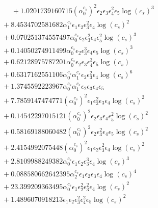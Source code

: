 \documentclass[10pt]{article}
\begin{document}
\begin{align*}
\phantom{F_{s,7}} &\phantom{={}}{}  + 1.0201739160715 \left(\alpha_{0}^{c_s}\right)^{2} \epsilon_{2} \epsilon_{3} \epsilon_{4}^{2} \epsilon_{5} \log{\left(c_{s} \right)}^{3} \\
&{}  + 8.4534702581682 \alpha_{1}^{c_s} \epsilon_{1} \epsilon_{2} \epsilon_{3}^{2} \epsilon_{4} \log{\left(c_{s} \right)}^{2} \\
&{}  + 0.070251374557497 \alpha_{0}^{c_s} \epsilon_{2} \epsilon_{3}^{2} \epsilon_{4} \epsilon_{5}^{2} \log{\left(c_{s} \right)}^{3} \\
&{}  + 0.14050274911499 \alpha_{0}^{c_s} \epsilon_{2} \epsilon_{3}^{3} \epsilon_{4} \epsilon_{5} \log{\left(c_{s} \right)}^{3} \\
&{}  + 0.62128975787201 \alpha_{0}^{c_s} \epsilon_{2} \epsilon_{3} \epsilon_{4}^{3} \epsilon_{5} \log{\left(c_{s} \right)} \\
&{}  + 0.6317162551106 \alpha_{0}^{c_s} \alpha_{1}^{c_s} \epsilon_{2} \epsilon_{3}^{2} \epsilon_{4} \log{\left(c_{s} \right)}^{6} \\
&{}  + 1.3745592223967 \alpha_{0}^{c_s} \alpha_{1}^{c_s} \epsilon_{2} \epsilon_{3} \epsilon_{4} \epsilon_{5} \\
&{}  + 7.7859147474771 \left(\alpha_{0}^{c_s}\right)^{2} \epsilon_{1} \epsilon_{2}^{2} \epsilon_{3} \epsilon_{4} \log{\left(c_{s} \right)}^{2} \\
&{}  + 0.14542297015121 \left(\alpha_{0}^{c_s}\right)^{2} \epsilon_{2} \epsilon_{3} \epsilon_{4} \epsilon_{5}^{2} \log{\left(c_{s} \right)}^{2} \\
&{}  + 0.58169188060482 \left(\alpha_{0}^{c_s}\right)^{2} \epsilon_{2} \epsilon_{3}^{2} \epsilon_{4} \epsilon_{5} \log{\left(c_{s} \right)}^{2} \\
&{}  + 2.4154992075448 \left(\alpha_{0}^{c_s}\right)^{2} \epsilon_{1} \epsilon_{2} \epsilon_{3}^{2} \epsilon_{4} \log{\left(c_{s} \right)}^{2} \\
&{}  + 2.8109988249382 \alpha_{0}^{c_s} \epsilon_{1} \epsilon_{2} \epsilon_{3}^{3} \epsilon_{4} \log{\left(c_{s} \right)}^{3} \\
&{}  + 0.088580662642395 \alpha_{2}^{c_s} \epsilon_{1} \epsilon_{2} \epsilon_{3} \epsilon_{4} \log{\left(c_{s} \right)}^{4} \\
&{}  + 23.399209363495 \alpha_{0}^{c_s} \epsilon_{1} \epsilon_{2}^{2} \epsilon_{3}^{2} \epsilon_{4} \log{\left(c_{s} \right)}^{2} \\
&{}  + 1.4896070918213 \epsilon_{1} \epsilon_{2} \epsilon_{3}^{2} \epsilon_{4}^{2} \epsilon_{5} \log{\left(c_{s} \right)}^{2} \\

\end{align*}
\end{document}
